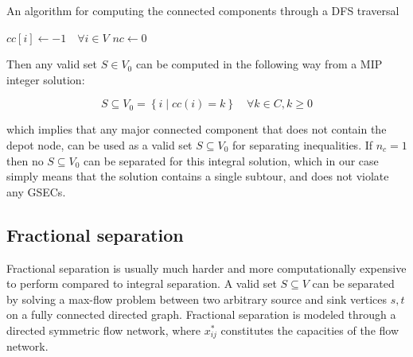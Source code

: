 \begin{algorithm}
	\caption{An algorithm for computing the connected components through a DFS traversal}
	\label{src:cc-dfs}
	$cc[i] \gets -1 \quad \forall i \in V$\;
	$nc \gets 0$\;

	\;
	\;
	\;
	\;
\end{algorithm}
Then any valid set $S \in V_0$ can be computed in the following way from a MIP integer solution:

\begin{equation}
	S \subseteq V_0 = \left\{ i \mid cc(i) = k  \right\}   \quad \forall k \in C, k \ge 0
\end{equation}

which implies that any major connected component that does not contain the depot node, can be used as a valid set $S \subseteq V_0$ for separating inequalities.
If $n_c = 1$ then no $S \subseteq V_0$ can be separated for this integral solution, which in our case simply means that the solution contains a single subtour, and does not violate any GSECs.


\subsection{Fractional separation}
Fractional separation is usually much harder and more computationally expensive to perform compared to integral separation.
A valid set $S \subseteq V$ can be separated by solving a max-flow problem between two arbitrary source and sink vertices $s, t$ on a fully connected directed graph.
Fractional separation is modeled through a directed symmetric flow network, where $x^*_{ij}$ constitutes the capacities of the flow network.

